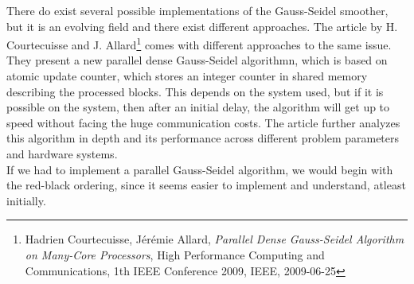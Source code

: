 There do exist several possible implementations of the Gauss-Seidel smoother, but it is an evolving field and there exist different approaches. The article by H. Courtecuisse and J. Allard\footnote{Hadrien Courtecuisse, J\'{e}r\'{e}mie Allard, \textit{Parallel Dense Gauss-Seidel Algorithm on Many-Core Processors}, High Performance Computing and Communications, 1th IEEE Conference 2009, IEEE, 2009-06-25} comes with different approaches to the same issue. They present a new parallel dense Gauss-Seidel algorithmn, which is based on atomic update counter, which stores an integer counter in shared memory describing the processed blocks. This depends on the system used, but if it is possible on the system, then after an initial delay, the algorithm will get up to speed without facing the huge communication costs. The article further analyzes this algorithm in depth and its performance across different problem parameters and hardware systems.\\
If we had to implement a parallel Gauss-Seidel algorithm, we would begin with the red-black ordering, since it seems easier to implement and understand, atleast initially.